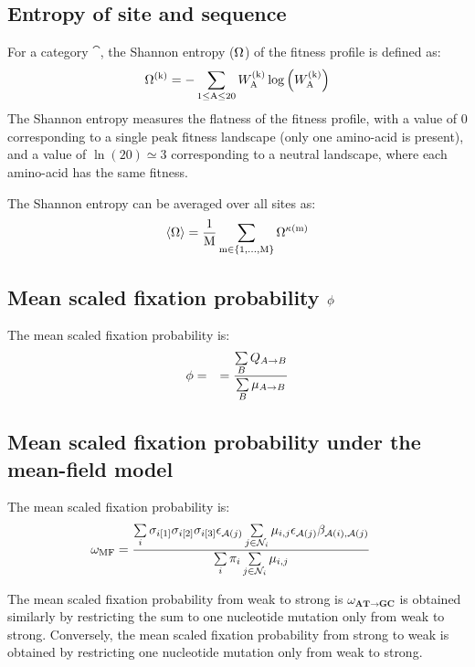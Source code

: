 \subsection{Entropy of site and sequence}
\label{subsec:entropy}

For a category $\cat$, the Shannon entropy (${\Omega}$) of the fitness profile is defined as:
\begin{equation}
    {\Omega}^{(\text{k})} = - \sum\limits_{1 \leq \text{A} \leq 20} W^{(\text{k})}_{\text{A}} \log \left( W^{(\text{k})}_{\text{A}} \right)
\end{equation}
The Shannon entropy measures the flatness of the fitness profile, with a value of $0$ corresponding to a single peak fitness landscape (only one amino-acid is present), and a value of $\ln(20)\simeq3$ corresponding to a \gls{neutral} landscape, where each amino-acid has the same fitness.

The Shannon entropy can be averaged over all sites as:
\begin{equation}
    \langle {\Omega} \rangle = \dfrac{1}{\text{M}}\sum\limits_{\text{m} \in \{1, \hdots, \text{M}\}} {\Omega}^{\kappa\left(\text{m}\right)}
\end{equation}

\subsection{Mean scaled fixation probability \texorpdfstring{$\phi$}{φ}}
\label{subsec:fixation-bias}
The mean scaled fixation probability is:
\begin{align}
    \phi & = & = \dfrac{ \sum\limits_{B} Q_{A \to B}}{ \sum\limits_{B} \mu_{A \to B}}
\end{align}

\subsection{Mean scaled fixation probability under the mean-field model}
\label{sec-mut-bias:mean-field-omega}

The mean scaled fixation probability is:
\begin{align}
    \omega_{\text{MF}} & = \dfrac{ \sum\limits_{i} \sigma_{{i}[1]}\sigma_{{i}[2]}\sigma_{{i}[3]} \epsilon_{\mathcal{A}({j})} \sum\limits_{j \in \mathcal{N}_{{i}}} \mu_{{i}, {j}} \epsilon_{\mathcal{A}({j})} \beta_{\mathcal{A}({i}), \mathcal{A}({j})} }{\sum\limits_{i} \pi_{i} \sum\limits_{j \in \mathcal{N}_{{i}} } \mu_{{i}, {j}}}
\end{align}

The mean scaled fixation probability from weak to strong is $\omega_{\textbf{AT} \rightarrow \textbf{GC}}$ is obtained similarly by restricting the sum to one nucleotide mutation only from weak to strong.
Conversely, the mean scaled fixation probability from strong to weak is obtained by restricting one nucleotide mutation only from weak to strong.

